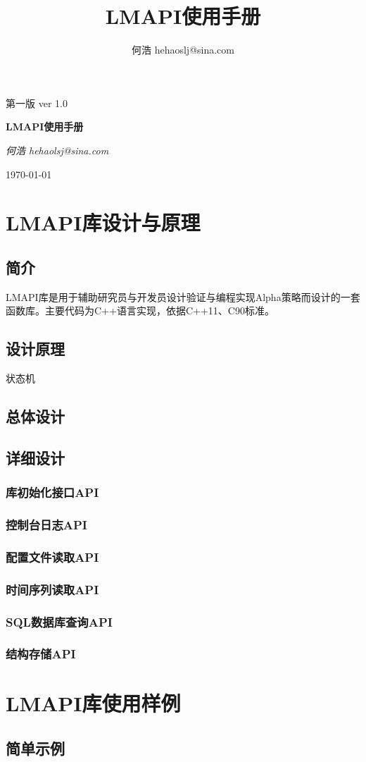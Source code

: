 \documentclass[11pt]{book}
\title{LMAPI使用手册}
\author{何浩 hehaoslj@sina.com}
\begin{document}
\begin{titlepage}
{\large    第一版}
{\normalsize ver 1.0}

\vspace*{\fill}

\begin{center}
{\Huge\bfseries
LMAPI使用手册}

\bigskip
{\Large\itshape
何浩 hehaolsj@sina.com}

\medskip
\today
\end{center}
\end{titlepage}

\tableofcontents

\part[设计]{LMAPI库设计与原理}
\chapter{简介}

LMAPI库是用于辅助研究员与开发员设计验证与编程实现Alpha策略而设计的一套函数库。主要代码为C++语言实现，依据C++11、C90标准。
    \chapter{设计原理}
    状态机
    \chapter{总体设计}
    \chapter{详细设计}
    \section{库初始化接口API}
    \section{控制台日志API}
    \section{配置文件读取API}
    \section{时间序列读取API}
    \section{SQL数据库查询API}
    \section{结构存储API}
\part[用例]{LMAPI库使用样例}
    \chapter{简单示例}
\end{document}
